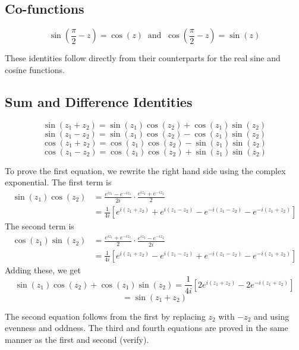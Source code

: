 \documentclass[handout]{ximera}
\begin{document}
\subsection{Co-functions}
\begin{proposition}
\[
\sin\left(\frac{\pi}{2}-z\right) = \cos(z) \;\; \mbox{and} \;\; \cos\left(\frac{\pi}{2}-z\right) = \sin(z)
\]
\end{proposition}
These identities follow directly from their counterparts for the real sine and cosine functions.

\subsection{Sum and Difference Identities}
\begin{proposition}
\[
\sin(z_1 + z_2) = \sin(z_1)\cos(z_2) + \cos(z_1)\sin(z_2)
\]
\[
\sin(z_1 - z_2) = \sin(z_1)\cos(z_2) - \cos(z_1)\sin(z_2)
\]
\[
\cos(z_1 + z_2) = \cos(z_1)\cos(z_2) - \sin(z_1)\sin(z_2)
\]
\[
\cos(z_1 - z_2) = \cos(z_1)\cos(z_2) + \sin(z_1)\sin(z_2)
\]
\end{proposition}
To prove the first equation, we rewrite the right hand side using the complex exponential. The first term is
\begin{align*}
\sin(z_1)\cos(z_2) &= \frac{e^{iz_1} - e^{- iz_1}}{2i} \cdot \frac{e^{iz_2} + e^{-iz_2}}{2}\\
&= \frac{1}{4i}\left[e^{i(z_1+ z_2)} + e^{i(z_1 - z_2)} - e^{-i(z_1 - z_2)} - e^{-i(z_1+ z_2)}\right]
\end{align*}
The second term is
\begin{align*}
\cos(z_1)\sin(z_2) &= \frac{e^{iz_1} + e^{- iz_1}}{2} \cdot \frac{e^{iz_2} - e^{-iz_2}}{2i}\\
&= \frac{1}{4i}\left[e^{i(z_1+ z_2)} - e^{i(z_1 - z_2)} + e^{-i(z_1 - z_2)} - e^{-i(z_1+ z_2)}\right]
\end{align*}
Adding these, we get
\[
\sin(z_1)\cos(z_2) + \cos(z_1)\sin(z_2)  = \frac{1}{4i}\left[2e^{i(z_1+ z_2)} - 2e^{-i(z_1+ z_2)}\right]
\]
\[
= \sin(z_1 + z_2)
\]




The second equation follows from the first by replacing $z_2$ with $-z_2$ and using evenness and oddness.
The third and fourth equations are proved in the same manner as the first and second (verify).
\end{document}
